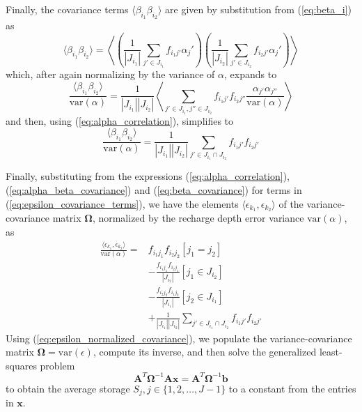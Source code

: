 \documentclass[11pt,a4paper]{article}
\renewcommand{\vec}[1]{\mathbf{#1}}
\begin{document}
Finally, the covariance terms $\langle\beta_{i_1}\beta_{i_2}\rangle$
are given by substitution from (\ref{eq:beta_i}) as
\begin{equation}
  \label{eq:beta_covariance}
  \langle\beta_{i_1}\beta_{i_2}\rangle =
  \left\langle
  \left(\frac{1}{|J_{i_1}|}\sum_{j' \in J_{i_1}} f_{i_1 j'} \alpha_j'\right)
  \left(\frac{1}{|J_{i_2}|}\sum_{j' \in J_{i_2}} f_{i_2 j'} \alpha_j'\right)
  \right\rangle
\end{equation}
which, after again normalizing by the variance of $\alpha$, expands to
\begin{equation}
  \frac{\langle\beta_{i_1}\beta_{i_2}\rangle}{\text{var}(\alpha)} =
  \frac{1}{|J_{i_1}| |J_{i_2}|}\left\langle
    \sum_{j' \in J_{i_1}, j'' \in J_{i_2}} f_{i_1 j'} f_{i_2 j''} \frac{\alpha_{j'}\alpha_{j''}}{\text{var}(\alpha)}
  \right\rangle
\end{equation}
and then, using (\ref{eq:alpha_correlation}), simplifies to
\begin{equation}
  \frac{\langle\beta_{i_1}\beta_{i_2}\rangle}{\text{var}(\alpha)} =
  \frac{1}{|J_{i_1}| |J_{i_2}|} \sum_{j' \in J_{i_1}\cap J_{i_2}} f_{i_1 j'} f_{i_2 j'}
\end{equation}

Finally, substituting from the expressions
(\ref{eq:alpha_correlation}), (\ref{eq:alpha_beta_covariance}) and
(\ref{eq:beta_covariance}) for terms in
(\ref{eq:epsilon_covariance_terms}), we have the elements
$\langle \epsilon_{k_1}, \epsilon_{k_2} \rangle$ of the
variance-covariance matrix $\bm{\Omega}$, normalized by the recharge depth
error variance $\text{var}(\alpha)$, as
\begin{align}
\label{eq:epsilon_normalized_covariance}
  \frac{\langle \epsilon_{k_1}, \epsilon_{k_2} \rangle}{\text{var}(\alpha)} =
  &f_{i_1 j_1} f_{i_2 j_2} [j_1 = j_2] \\
  &- \frac{f_{i_1 j_1} f_{i_2 j_1}}{|J_{i_2}|} [j_1 \in J_{i_2}]\\
  &- \frac{f_{i_2 j_2} f_{i_1 j_2}}{|J_{i_1}|} [j_2 \in J_{i_1}]\\
  &+ \frac{1}{|J_{i_1}| |J_{i_2}|} \sum_{j' \in J_{i_1}\cap J_{i_2}} f_{i_1 j'} f_{i_2 j'}
\end{align}
Using (\ref{eq:epsilon_normalized_covariance}), we populate the
variance-covariance matrix
$\bm{\Omega} = \text{var}(\mathbb\epsilon)$, compute its inverse,
and then solve the generalized least-squares problem
\begin{equation}
  \vec{A}^T \bm{\Omega}^{-1} \vec{A} \vec{x} = \vec{A}^T \bm{\Omega}^{-1} \vec{b}
\end{equation}
to obtain the average storage $S_j, j \in \{1, 2, \ldots, J - 1\}$ to
a constant from the entries in $\vec{x}$.
\end{document}
